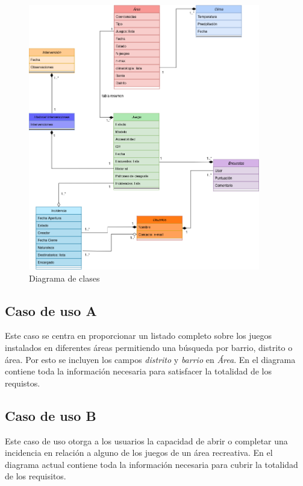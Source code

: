 \documentclass[]{article}
\begin{document}
\begin{figure}[H]
    \centering
    \includegraphics[width=0.9\textwidth]{diagrama_arqui-noaggregados.png}
    \caption{\small Diagrama de clases}
\end{figure}

\subsection{Caso de uso A}
\label{subsec:casoA}
Este caso se centra en proporcionar un listado completo sobre los juegos instalados en diferentes áreas permitiendo una búsqueda por barrio, distrito o área. Por esto se incluyen los campos \textit{distrito} y \textit{barrio} en \textit{Área}. En el diagrama contiene toda la información necesaria para satisfacer la totalidad de los requistos.

\subsection{Caso de uso B}
\label{subsec:casoB}
Este caso de uso otorga a los usuarios la capacidad de abrir o completar una incidencia en relación a alguno de los juegos de un área recreativa. En el diagrama actual contiene toda la información necesaria para cubrir la totalidad de los requisitos.
\end{document}
